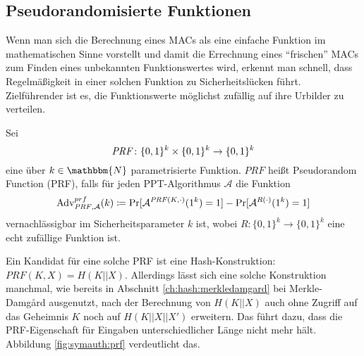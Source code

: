 \subsection{Pseudorandomisierte Funktionen}\label{ssec:prf} Wenn man
sich die Berechnung eines MACs als eine einfache Funktion im
mathematischen Sinne vorstellt und damit die Errechnung eines
"`frischen"' MACs zum Finden eines unbekannten Funktionswertes wird,
erkennt man schnell, dass Regelmäßigkeit in einer solchen Funktion zu
Sicherheitslücken führt. Zielführender ist es, die Funktionswerte
möglichst zufällig auf ihre Urbilder zu verteilen.
\begin{definition}
  Sei \[\text{\textit{PRF}}\colon\{0,1\}^k \times \{0, 1\}^k \rightarrow
    \{0,1\}^k\] eine über $k \in \mathbbm{N}$ parametrisierte
  Funktion. $PRF$ heißt Pseudorandom Function (PRF), falls für jeden
  PPT-Algorithmus $\mathcal{A}$ die Funktion
  \begin{equation*}
    \text{Adv}_{\text{\textit{PRF}},\mathcal{A}}^{prf}(k) \coloneqq \Pr \lbrack
    \mathcal{A}^{\text{\textit{PRF}}(K,\cdot)}(1^k) = 1 \rbrack - \Pr
    \lbrack \mathcal{A}^{R(\cdot)}(1^k) = 1 \rbrack
  \end{equation*} vernachlässigbar im Sicherheitsparameter $k$ ist,
  wobei $R: \{0,1\}^k \rightarrow \{0,1\}^k$ eine echt zufällige Funktion
  ist.~\\
\end{definition}

Ein Kandidat für eine solche PRF ist eine Hash-Konstruktion: $PRF(K,X) =
H(K||X)$. Allerdings lässt sich eine solche Konstruktion manchmal, wie
bereits in Abschnitt \ref{ch:hash:merkledamgard} bei Merkle-Damgård
ausgenutzt, nach der Berechnung von $H(K||X)$ auch ohne Zugriff auf das
Geheimnis $K$ noch auf $H(K||X||X')$ erweitern. Das führt dazu, dass die
PRF-Eigenschaft für Eingaben unterschiedlicher Länge nicht mehr
hält. Abbildung \ref{fig:symauth:prf} verdeutlicht das.

